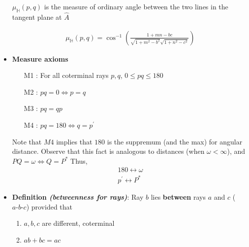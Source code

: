 \documentclass{report}
\begin{document}
\begin{itemize}
                    \bigbreak \noindent 
                    $\mu_{\mathbb{H}}(p,q)$ is the measure of ordinary angle between the two lines in the tangent plane at $\hat{A} $
                    \bigbreak \noindent 
                    \bigbreak \noindent 
                    \begin{figure}[ht]
                        \centering
                        \label{fig:diag2}
                    \end{figure}
                    \bigbreak \noindent 
                    \begin{align*}
                       \mu_{\mathbb{H}}(p,q) = \cos^{-1}{\left(\frac{1+mn-bc}{\sqrt{1+m^{2}-b^{2}}\sqrt{1+n^{2}-c^{2}}}\right)} 
                    \end{align*}
                \item \textbf{Measure axioms}
                    \begin{enumerate}
                        \item [M1]: For all coterminal rays $p,q$, $0 \leq pq \leq 180$
                        \item [M2]: $pq = 0 \iff p=q$
                        \item [M3]: $pq = qp$
                        \item [M4]: $pq = 180 \iff q=p^{\prime} $
                    \end{enumerate}
                    \bigbreak \noindent 
                    Note that $M4$ implies that $180$ is the suppremum (and the max) for angular distance. Observe that this fact is analogous to distances (when $\omega < \infty$), and $PQ = \omega \iff Q = P^{*} $
                    \bigbreak \noindent 
                    Thus,
                    \begin{align*}
                        180 \leftrightarrow \omega \\
                        p^{\prime} \leftrightarrow P^{*}
                    \end{align*}
                \item \textbf{Definition \textit{(betweenness for rays)}}: Ray $b$ lies \textbf{between} rays $a$ and $c$ ($ a\text{-}b\text{-}c $) provided that
                    \begin{enumerate}[label=(\alph*)]
                        \item $a,b,c$ are different, coterminal
                        \item $ab + bc = ac $

\end{enumerate}
\end{itemize}
\end{document}

